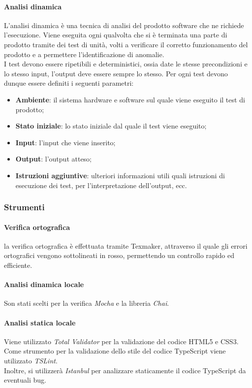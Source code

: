 \documentclass[11pt,a4paper]{article}
\begin{document}
{	\paragraph{Analisi dinamica\\}
	L'analisi dinamica è una tecnica di analisi del prodotto software che ne richiede l'esecuzione. Viene eseguita ogni qualvolta che si è terminata una parte di prodotto tramite dei test di unità, volti a verificare il corretto funzionamento del prodotto e a permettere l'identificazione di anomalie. \\
	I test devono essere ripetibili e deterministici, ossia date le stesse precondizioni e lo stesso input, l'output deve essere sempre lo stesso. Per ogni test devono dunque essere definiti i seguenti parametri:
	\begin{itemize}
		\item \textbf{Ambiente}: il sistema hardware e software sul quale viene eseguito il test di prodotto;
		\item \textbf{Stato iniziale}: lo stato iniziale dal quale il test viene eseguito;
		\item \textbf{Input}: l'input che viene inserito;
		\item \textbf{Output}: l'output atteso;
		\item \textbf{Istruzioni aggiuntive}: ulteriori informazioni utili quali istruzioni di esecuzione dei test, per l'interpretazione dell'output, ecc. 
	\end{itemize}
		
	\subsubsection{Strumenti}	
	\paragraph{Verifica ortografica\\}
	la verifica ortografica è effettuata tramite Texmaker, attraverso il quale gli errori ortografici vengono sottolineati in rosso, permettendo un controllo rapido ed efficiente.
	\paragraph{Analisi dinamica locale\\}
	Son stati scelti per la verifica \textit{Mocha} e la libreria \textit{Chai}. 
	\paragraph{Analisi statica locale\\}
	Viene utilizzato \textit{Total Validator} per la validazione del codice HTML5 e CSS3. \\
	Come strumento per la validazione dello stile del codice TypeScript viene utilizzato \textit{TSLint}. \\
	Inoltre, si utilizzerà \textit{Istanbul} per analizzare staticamente il codice TypeScript da eventuali bug.
	
}
\end{document}
